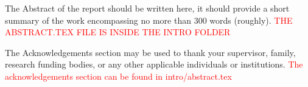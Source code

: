 \beforeabstract
{}

The Abstract of the report should be written here, it should provide a short summary of the work encompassing no more than 300 words (roughly). \textcolor{red}{THE ABSTRACT.TEX FILE IS INSIDE THE INTRO FOLDER}

The Acknowledgements section may be used to thank your supervisor, family, research funding bodies, or any other applicable individuals or institutions. \textcolor{red}{The acknowledgements section can be found in intro/abstract.tex}

\afterpreface \afterabstract